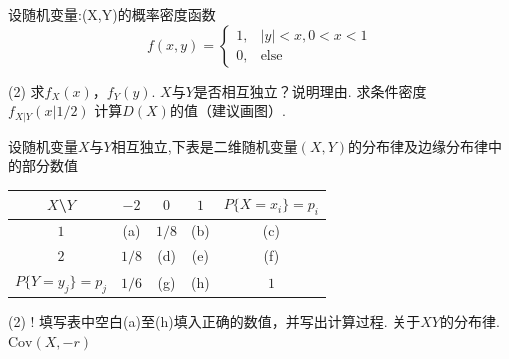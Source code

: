 \begin{problem}[本题15分]
    设随机变量:(X,Y)的概率密度函数
    \[f(x,y)=
    \begin{cases}
        1, & |y|<x,0<x<1\\
        0, & \text{else}
    \end{cases}\]
    \begin{tasks}[label=\arabic*.](2)
        \task 求$f_X(x)$，$f_Y(y)$.
        \task $X$与$Y$是否相互独立？说明理由.
        \task 求条件密度 $f_{X|Y}(x|1/2)$
        \task 计算$D(X)$的值（建议画图）.
    \end{tasks}
\end{problem}
\begin{solution}

\end{solution}

\begin{problem}[本题15分]
    设随机变量$X$与$Y$相互独立,下表是二维随机变量$(X,Y)$的分布律及边缘分布律中的部分数值
    \begin{table}[htbp]
        \centering
        \begin{tabular}{ccccc}
            \toprule
            $X$\textbackslash$Y$ & $-2$ & $0$ & $1$ & $P\{X=x_i\}=p_i$\\
            \midrule
            $1$ & (a) & $1/8$ & (b) & (c) \\
            $2$ & $1/8$ & (d) & (e) & (f) \\
            $P\{Y=y_j\}=p_j$ & $1/6$ & (g) & (h) & $1$\\
            \bottomrule
        \end{tabular}
    \end{table}
    \begin{tasks}[label=\arabic*.](2)
        \task! 填写表中空白(a)至(h)填入正确的数值，并写出计算过程.
        \task 关于$XY$的分布律.
        \task $\text{Cov}(X,-r)$
    \end{tasks}
\end{problem}
\begin{solution}

\end{solution}


